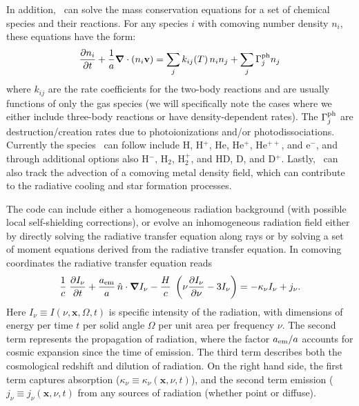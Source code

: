 
In addition, \enzo\ can solve the mass conservation equations for a set of
chemical species and their reactions.  For any species $i$ with comoving
number density $n_i$, these equations have the form:
\begin{equation}
  \frac{\partial n_i}{\partial t} 
  + \frac{1}{a} \div (n_i \vecv) = 
  \sum_j k_{ij}(T) \, n_i n_j + \sum_j \Gamma^{\rm ph}_j n_j 
  \label{eq:species_evolution}
\end{equation}
where $k_{ij}$ are the rate coefficients for the two-body reactions
and are usually functions of only the gas species (we will
specifically note the cases where we either include three-body
reactions or have density-dependent rates).  The $\Gamma^{\rm ph}_j$
are destruction/creation rates due to photoionizations and/or
photodissociations.  Currently the species \enzo\ can follow include
H, H$^+$, He, He$^+$, He$^{++}$, and e$^-$, and through additional
options also H$^-$, H$_2$, H$_2^+$, and HD, D, and D$^+$. Lastly,
\enzo\ can also track the advection of a comoving metal density field,
which can contribute to the radiative cooling and star formation
processes.

The code can include either a homogeneous radiation background (with
possible local self-shielding corrections), or evolve an inhomogeneous
radiation field either by directly solving the radiative transfer
equation along rays or by solving a set of moment equations derived
from the radiative transfer equation. In comoving coordinates
\citep[e.g.,][]{Gnedin97} the radiative transfer equation reads
%
\begin{equation}
  \label{eq:rteqn}
  \frac{1}{c} \; \frac{\partial I_\nu}{\partial t} + 
  \frac{a_{\rm em}}{a} \, \hat{n} \cdot \grad I_\nu -
  \frac{H}{c} \; \left( \nu \frac{\partial I_\nu}{\partial \nu} -
  3 I_\nu \right) = -\kappa_\nu I_\nu + j_\nu .
\end{equation}
%
Here $I_\nu \equiv I(\nu, \mathbf{x}, \Omega, t)$ is specific
intensity of the radiation, with dimensions of energy per time $t$ per
solid angle $\Omega$ per unit area per frequency $\nu$.  The second
term represents the propagation of radiation, where the factor $a_{\rm
  em}/a$ accounts for cosmic expansion since the time of emission.
The third term describes both the cosmological redshift and dilution
of radiation.  On the right hand side, the first term captures
absorption ($\kappa_\nu \equiv \kappa_\nu(\mathbf{x},\nu,t)$), and the
second term emission ($j_\nu \equiv j_\nu(\mathbf{x},\nu,t)$ from any
sources of radiation (whether point or diffuse).


